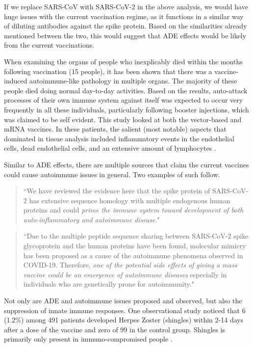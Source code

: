 \documentclass[10pt, a4paper, twocolumn]{book}
\begin{document}
If we replace SARS-CoV with SARS-CoV-2 in the above analysis, we would have huge issues with the current vaccination regime, as it functions in a similar way of diluting antibodies against the spike protein. Based on the similarities already mentioned between the two, this would suggest that ADE effects would be likely from the current vaccinations.

When examining the organs of people who inexplicably died within the months following vaccination (15 people), it has been shown that there was a vaccine-induced autoimmune-like pathology in multiple organs. The majority of these people died doing normal day-to-day activities. Based on the results, auto-attack processes of their own immune system against itself was expected to occur very frequently in all these individuals, particularly following booster injections, which was claimed to be self evident. This study looked at both the vector-based and mRNA vaccines. In these patients, the salient (most notable) aspects that dominated in tissue analysis included inflammatory events in the endothelial cells, dead endothelial cells, and an extensive amount of lymphocytes \citep{SucharitEvidenceOfCausitiveEffects}. 

Similar to ADE effects, there are multiple sources that claim the current vaccines could cause autoimmune issues in general. Two examples of such follow.

\begin{quotation}
	``We have reviewed the evidence here that the spike protein of SARS-CoV-2 has extensive sequence
	homology with multiple endogenous human proteins and could \textit{prime the immune system toward
	development of both auto-inflammatory and autoimmune disease}." \citep{WorseThanTheDisease}
\end{quotation}

\begin{quotation}
	``Due to the multiple peptide sequence sharing between SARS-CoV-2 spike glycoprotein and the human proteins have been found, molecular mimicry has been proposed as a cause of the	autoimmune phenomena observed in COVID-19. Therefore, \textit{one of the potential side effects of giving a mass vaccine could be an emergence of autoimmune diseases} especially in individuals who are genetically prone for autoimmunity." \citep{AntibodiesInCOVID19}
\end{quotation}

Not only are ADE and autoimmune issues proposed and observed, but also the suppression of innate immune responses. One observational study noticed that 6 (1.2\%) among 491 patients developed Herpes Zoster (shingles) within 2-14 days after a dose of the vaccine and zero of 99 in the control group. Shingles is primarily only present in immuno-compromised people \citep{HerpesFollowingVaccine}.
\end{document}
